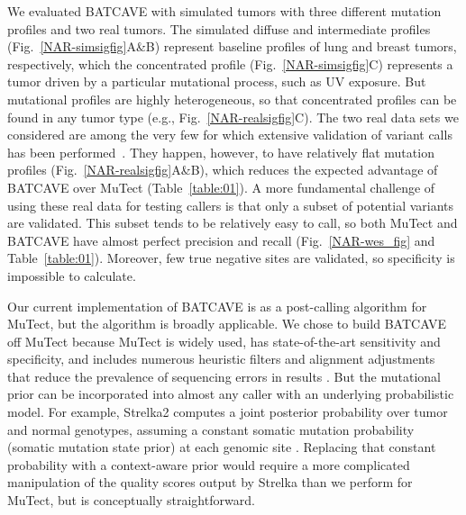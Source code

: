 \documentclass[a4,center,fleqn]{NAR}
\newcommand{\batcave}{BATCAVE }
\begin{document}
We evaluated \batcave with simulated tumors with three different mutation profiles and two real tumors.
The simulated diffuse and intermediate profiles (Fig.~\ref{NAR-simsigfig}A\&B) represent baseline profiles of lung and breast tumors, respectively, which the concentrated profile (Fig.~\ref{NAR-simsigfig}C) represents a tumor driven by a particular mutational process, such as UV exposure.
But mutational profiles are highly heterogeneous, so that concentrated profiles can be found in any tumor type (e.g., Fig.~\ref{NAR-realsigfig}C).
The two real data sets we considered are among the very few for which extensive validation of variant calls has been performed~\cite{Griffith2015, Shi2018}.
They happen, however, to have relatively flat mutation profiles (Fig.~\ref{NAR-realsigfig}A\&B), which reduces the expected advantage of \batcave over MuTect (Table~\ref{table:01}).
A more fundamental challenge of using these real data for testing callers is that only a subset of potential variants are validated.
This subset tends to be relatively easy to call, so both MuTect and \batcave have almost perfect precision and recall (Fig.~\ref{NAR-wes_fig} and Table~\ref{table:01}).
Moreover, few true negative sites are validated, so specificity is impossible to calculate.


Our current implementation of \batcave is as a post-calling algorithm for MuTect, but the algorithm is broadly applicable.
We chose to build \batcave off MuTect because MuTect is widely used, has state-of-the-art sensitivity and specificity, and includes numerous heuristic filters and alignment adjustments that reduce the prevalence of sequencing errors in results \cite{Cibulskis2013,Griffith2015}.
But the mutational prior can be incorporated into almost any caller with an underlying probabilistic model.
For example, Strelka2 computes a joint posterior probability over tumor and normal genotypes, assuming a constant somatic mutation probability (somatic mutation state prior) at each genomic site \cite{Kim2018}.
Replacing that constant probability with a context-aware prior would require a more complicated manipulation of the quality scores output by Strelka than we perform for MuTect, but is conceptually straightforward.
\end{document}
